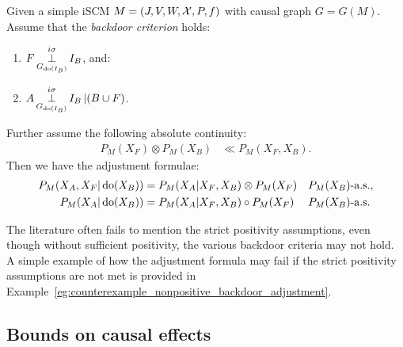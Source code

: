 \begin{Cor}\label{cor:backdoor-scms}
  Given a simple iSCM $M = \left ( J, V, W, \mathcal{X}, P, f \right )$ with causal graph $G = G(M)$. %
  Assume that the \emph{backdoor criterion} holds:
  \begin{enumerate}
    \item $\displaystyle F \operatorname*{\perp}^{i\sigma}_{G_{\operatorname{do}(I_B)}} I_B$, and:
    \item $\displaystyle A \operatorname*{\perp}^{i\sigma}_{G_{\operatorname{do}(I_B)}} I_B  \operatorname*{|} (B \cup F)$.
  \end{enumerate}
  Further assume the following absolute continuity:
  \begin{align*}
      P_M(X_F) \otimes P_M(X_B) &\ll  P_M(X_F,X_B).
  \end{align*}
  Then we have the adjustment formulae: 
  \begin{align*} 
    P_M(X_A,X_F|\operatorname{do}(X_B)) &= P_M(X_A|X_F,X_B) \otimes P_M(X_F)  && P_M(X_B)\text{-a.s.}, \\
    P_M(X_A|\operatorname{do}(X_B)) &= P_M(X_A|X_F,X_B) \circ P_M(X_F)   && P_M(X_B)\text{-a.s.}
  \end{align*}
\end{Cor}
The literature often fails to mention the strict positivity assumptions, even though without sufficient positivity, the various backdoor criteria may not hold.
A simple example of how the adjustment formula may fail if the strict positivity assumptions are not met is provided in Example~\ref{eg:counterexample_nonpositive_backdoor_adjustment}.


\subsection{Bounds on causal effects}

